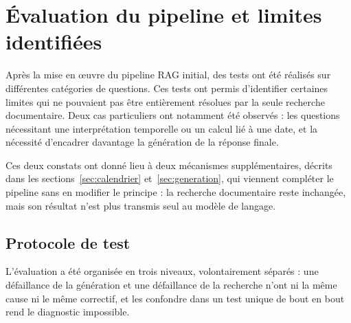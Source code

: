 %
%


\section{Évaluation du pipeline et limites identifiées}
\label{sec:eval-rag}

Après la mise en œuvre du pipeline RAG initial, des tests ont été réalisés sur
différentes catégories de questions. Ces tests ont permis d'identifier certaines
limites qui ne pouvaient pas être entièrement résolues par la seule recherche
documentaire. Deux cas particuliers ont notamment été observés : les questions
nécessitant une interprétation temporelle ou un calcul lié à une date, et la
nécessité d'encadrer davantage la génération de la réponse finale.

Ces deux constats ont donné lieu à deux mécanismes supplémentaires, décrits dans
les sections~\ref{sec:calendrier} et~\ref{sec:generation}, qui viennent compléter
le pipeline sans en modifier le principe : la recherche documentaire reste
inchangée, mais son résultat n'est plus transmis seul au modèle de langage.

\subsection{Protocole de test}

L'évaluation a été organisée en trois niveaux, volontairement séparés : une
défaillance de la génération et une défaillance de la recherche n'ont ni la même
cause ni le même correctif, et les confondre dans un test unique de bout en bout
rend le diagnostic impossible.

